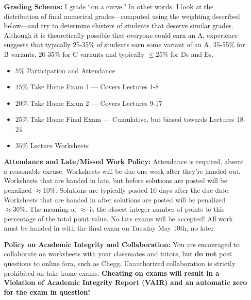 \documentclass[11pt,reqno]{amsproc}
\begin{document}
\noindent\textbf{Grading Schema:} I grade ``on a curve.'' In other words, I look at the distribution of final numerical grades---computed using the weighting described below---and try to determine clusters of students that deserve similar grades. Although it is theoretically possible that everyone could earn an A, experience suggests that typically 25-35\% of students earn some variant of an A, 35-55\% for B variants, 20-35\% for C variants and typically $\leq 25\%$ for Ds and Es.

\begin{itemize}
	\item $5\%$ Participation and Attendance
	\item $15 \%$ Take Home Exam 1 --- Covers Lectures 1-8
	\item $20 \%$ Take Home Exam 2 --- Covers Lectures 9-17
  	\item $25 \%$ Take Home Final Exam --- Cumulative, but biased towards Lectures 18-24
	\item $35 \%$ Lecture Worksheets
\end{itemize}

\noindent\textbf{Attendance and Late/Missed Work Policy:}
Attendance is required, absent a reasonable excuse. Worksheets will be due one week after they're handed out. Worksheets that are handed in late, but before solutions are posted will be penalized $\approx10\%$. Solutions are typically posted 10 days after the due date. Worksheets that are handed in after solutions are posted will be penalized $\approx 30\%$. The meaning of $\approx$ is the closest integer number of points to this percentage of the total point value. No late exams will be accepted!  All work must be handed in with the final exam on Tuesday May 10th, no later.



\noindent\textbf{Policy on Academic Integrity and Collaboration:}
You are encouraged to collaborate on worksheets with your classmates and tutors, but \textbf{do not} post questions to online fora, such as Chegg. Unauthorized collaboration is strictly prohibited on take home exams. \textbf{Cheating on exams will result in a Violation of Academic Integrity Report (VAIR) and an automatic zero for the exam in question!}

\newpage
\end{document}
